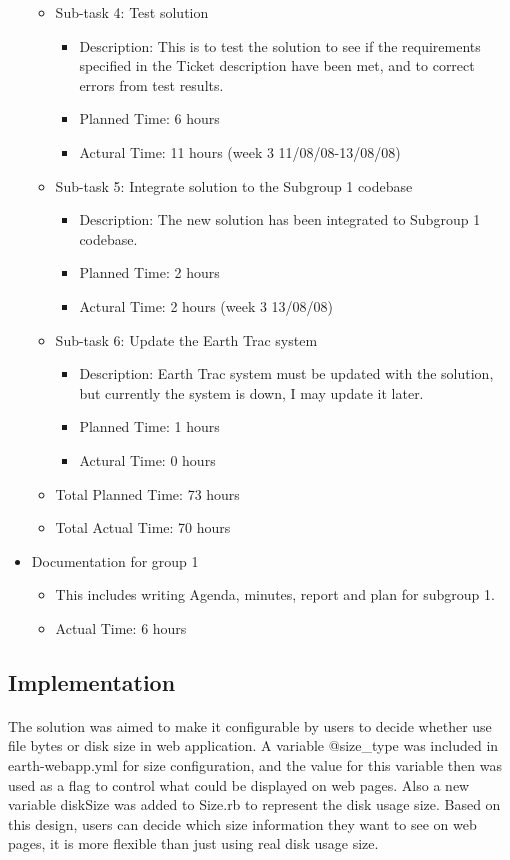 \documentclass[oneside, 10pt, a4]{article}
\begin{document}
\begin{itemize}
\begin{itemize}
\begin{itemize}
			\end{itemize}
 		\item Sub-task 4: Test solution
			\begin{itemize}
			\item Description: This is to test the solution to see if the requirements specified in the Ticket description have been met, and to correct errors from test results.
			\item Planned Time: 6 hours
			\item Actural Time: 11 hours (week 3 11/08/08-13/08/08)
			\end{itemize}
		\item Sub-task 5: Integrate solution to the Subgroup 1 codebase
			\begin{itemize}
			\item Description: The new solution has been integrated to Subgroup 1 codebase.
			\item Planned Time: 2 hours
			\item Actural Time: 2 hours (week 3 13/08/08)
			\end{itemize}
		\item Sub-task 6: Update the Earth Trac system
			\begin{itemize}
			\item Description: Earth Trac system must be updated with the solution, but currently the system is down, I may update it later.
			\item Planned Time: 1 hours
			\item Actural Time: 0 hours
			\end{itemize}
		\item Total Planned Time: 73 hours
		\item Total Actual Time: 70 hours
		\end{itemize}
\item Documentation for group 1	
		\begin{itemize}
		\item This includes writing Agenda, minutes, report and plan for subgroup 1.
		\item Actual Time: 6 hours
		\end{itemize}
\end{itemize}

\subsection*{Implementation}

\paragraph{}
The solution was aimed to make it configurable by users to decide whether use file bytes or disk size in web application. A variable @size\_type was included in earth-webapp.yml for size configuration, and the value for this variable then was used as a flag to control what could be displayed on web pages. Also a new variable diskSize was added to Size.rb to represent the disk usage size. Based on this design, users can decide which size information they want to see on web pages, it is more flexible than just using real disk usage size.
\end{document}
